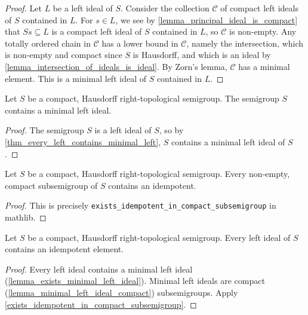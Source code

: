 \begin{proof}
\leanok{}
    Let $L$ be a left ideal of $S$.  Consider the collection $\mathcal{C}$ of compact left ideals of $S$ contained in $L$.  For $s \in L$, we see by \cref{lemma_principal_ideal_is_compact} that $Ss \subseteq L$ is a compact left ideal of $S$ contained in $L$, so $\mathcal{C}$ is non-empty.  Any totally ordered chain in $\mathcal{C}$ has a lower bound in $\mathcal{C}$, namely the intersection, which is non-empty and compact since $S$ is Hausdorff, and which is an ideal by \cref{lemma_intersection_of_ideals_is_ideal}.  By Zorn's lemma, $\mathcal{C}$ has a minimal element.  This is a minimal left ideal of $S$ contained in $L$.
\end{proof}

\begin{lemma}
\label{lemma_exists_minimal_left_ideal}
\leanok{}
    Let $S$ be a compact, Hausdorff right-topological semigroup.  The semigroup $S$ contains a minimal left ideal.
\end{lemma}

\begin{proof}
\leanok{}
    The semigroup $S$ is a left ideal of $S$, so by \cref{thm_every_left_contains_minimal_left}, $S$ contains a minimal left ideal of $S$.
\end{proof}

\begin{theorem}
    \label{exists_idempotent_in_compact_subsemigroup}
    \leanok{}
    Let $S$ be a compact, Hausdorff right-topological semigroup.  Every non-empty, compact subsemigroup of $S$ contains an idempotent.
\end{theorem}

\begin{proof}
\leanok{}
    This is precisely  \verb|exists_idempotent_in_compact_subsemigroup| in mathlib.
\end{proof}

\begin{lemma}
\label{lemma_left_ideal_contains_idempotent}
\leanok{}
    Let $S$ be a compact, Hausdorff right-topological semigroup.  Every left ideal of $S$ contains an idempotent element.
\end{lemma}

\begin{proof}
\leanok{}
    Every left ideal contains a minimal left ideal (\cref{lemma_exists_minimal_left_ideal}).  Minimal left ideals are compact (\cref{lemma_minimal_left_ideal_compact}) subsemigroups.  Apply \cref{exists_idempotent_in_compact_subsemigroup}.
\end{proof}

